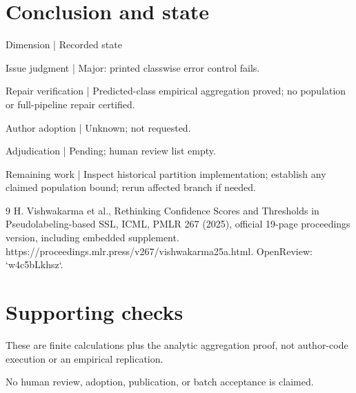 \documentclass[10pt]{article}
\begin{document}
\section*{Conclusion and state}
Dimension | Recorded state\par
Issue judgment | Major: printed classwise error control fails.\par
Repair verification | Predicted-class empirical aggregation proved; no population or full-pipeline repair certified.\par
Author adoption | Unknown; not requested.\par
Adjudication | Pending; human review list empty.\par
Remaining work | Inspect historical partition implementation; establish any claimed population bound; rerun affected branch if needed.\par
9 H. Vishwakarma et al., Rethinking Confidence Scores and Thresholds in Pseudolabeling-based SSL, ICML, PMLR 267 (2025), official 19-page proceedings version, including embedded supplement. https://proceedings.mlr.press/v267/vishwakarma25a.html. OpenReview: `w4c5bLkhsz`.\par
\section*{Supporting checks}
These are finite calculations plus the analytic aggregation proof, not author-code execution or an empirical replication.\par
No human review, adoption, publication, or batch acceptance is claimed.\par
\end{document}
